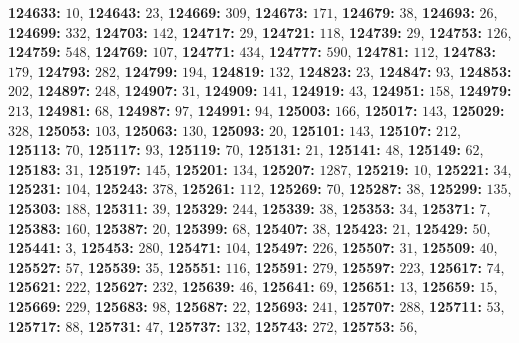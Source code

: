 \textsf{\bfseries 124633:} $10$, \textsf{\bfseries 124643:} $23$, \textsf{\bfseries 124669:} $309$, \textsf{\bfseries 124673:} $171$, \textsf{\bfseries 124679:} $38$, \textsf{\bfseries 124693:} $26$, \textsf{\bfseries 124699:} $332$, \textsf{\bfseries 124703:} $142$, \textsf{\bfseries 124717:} $29$, \textsf{\bfseries 124721:} $118$, \textsf{\bfseries 124739:} $29$, \textsf{\bfseries 124753:} $126$, \textsf{\bfseries 124759:} $548$, \textsf{\bfseries 124769:} $107$, \textsf{\bfseries 124771:} $434$, \textsf{\bfseries 124777:} $590$, \textsf{\bfseries 124781:} $112$, \textsf{\bfseries 124783:} $179$, \textsf{\bfseries 124793:} $282$, \textsf{\bfseries 124799:} $194$, \textsf{\bfseries 124819:} $132$, \textsf{\bfseries 124823:} $23$, \textsf{\bfseries 124847:} $93$, \textsf{\bfseries 124853:} $202$, \textsf{\bfseries 124897:} $248$, \textsf{\bfseries 124907:} $31$, \textsf{\bfseries 124909:} $141$, \textsf{\bfseries 124919:} $43$, \textsf{\bfseries 124951:} $158$, \textsf{\bfseries 124979:} $213$, \textsf{\bfseries 124981:} $68$, \textsf{\bfseries 124987:} $97$, \textsf{\bfseries 124991:} $94$, \textsf{\bfseries 125003:} $166$, \textsf{\bfseries 125017:} $143$, \textsf{\bfseries 125029:} $328$, \textsf{\bfseries 125053:} $103$, \textsf{\bfseries 125063:} $130$, \textsf{\bfseries 125093:} $20$, \textsf{\bfseries 125101:} $143$, \textsf{\bfseries 125107:} $212$, \textsf{\bfseries 125113:} $70$, \textsf{\bfseries 125117:} $93$, \textsf{\bfseries 125119:} $70$, \textsf{\bfseries 125131:} $21$, \textsf{\bfseries 125141:} $48$, \textsf{\bfseries 125149:} $62$, \textsf{\bfseries 125183:} $31$, \textsf{\bfseries 125197:} $145$, \textsf{\bfseries 125201:} $134$, \textsf{\bfseries 125207:} $1287$, \textsf{\bfseries 125219:} $10$, \textsf{\bfseries 125221:} $34$, \textsf{\bfseries 125231:} $104$, \textsf{\bfseries 125243:} $378$, \textsf{\bfseries 125261:} $112$, \textsf{\bfseries 125269:} $70$, \textsf{\bfseries 125287:} $38$, \textsf{\bfseries 125299:} $135$, \textsf{\bfseries 125303:} $188$, \textsf{\bfseries 125311:} $39$, \textsf{\bfseries 125329:} $244$, \textsf{\bfseries 125339:} $38$, \textsf{\bfseries 125353:} $34$, \textsf{\bfseries 125371:} $7$, \textsf{\bfseries 125383:} $160$, \textsf{\bfseries 125387:} $20$, \textsf{\bfseries 125399:} $68$, \textsf{\bfseries 125407:} $38$, \textsf{\bfseries 125423:} $21$, \textsf{\bfseries 125429:} $50$, \textsf{\bfseries 125441:} $3$, \textsf{\bfseries 125453:} $280$, \textsf{\bfseries 125471:} $104$, \textsf{\bfseries 125497:} $226$, \textsf{\bfseries 125507:} $31$, \textsf{\bfseries 125509:} $40$, \textsf{\bfseries 125527:} $57$, \textsf{\bfseries 125539:} $35$, \textsf{\bfseries 125551:} $116$, \textsf{\bfseries 125591:} $279$, \textsf{\bfseries 125597:} $223$, \textsf{\bfseries 125617:} $74$, \textsf{\bfseries 125621:} $222$, \textsf{\bfseries 125627:} $232$, \textsf{\bfseries 125639:} $46$, \textsf{\bfseries 125641:} $69$, \textsf{\bfseries 125651:} $13$, \textsf{\bfseries 125659:} $15$, \textsf{\bfseries 125669:} $229$, \textsf{\bfseries 125683:} $98$, \textsf{\bfseries 125687:} $22$, \textsf{\bfseries 125693:} $241$, \textsf{\bfseries 125707:} $288$, \textsf{\bfseries 125711:} $53$, \textsf{\bfseries 125717:} $88$, \textsf{\bfseries 125731:} $47$, \textsf{\bfseries 125737:} $132$, \textsf{\bfseries 125743:} $272$, \textsf{\bfseries 125753:} $56$, 
